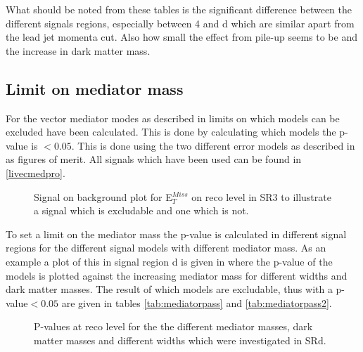 What should be noted from these tables is the significant difference between the different signals regions, especially between 4 and d which are similar apart from the lead jet momenta cut. Also how small the effect from pile-up seems to be and the increase in dark matter mass.

\newpage
\subsection{Limit on mediator mass}\label{sec:res:subsec:Mm}
For the vector mediator modes as described in  limits on which models can be excluded have been calculated. This is done by calculating which models the p-value is $<0.05$. This is done using the two different error models as described in  as figures of merit. All signals which have been used can be found in \ref{livecmedpro}.


 \begin{figure}[H] %
    \hfill
    \caption{Signal on background plot for E$^{Miss}_T$ on reco level in SR3 to illustrate a signal which is excludable and one which is not. }
    \label{fig:sigback}
  \end{figure}

To set a limit on the mediator mass the p-value is calculated in different signal regions for the different signal models with different mediator mass. As an example a plot of this in signal region d is given in  where the p-value of the models is plotted against the increasing mediator mass for different widths and dark matter masses. The result of which models are excludable, thus with a p-value$<0.05$ are given in tables \ref{tab:mediatorpass} and \ref{tab:mediatorpass2}.

 \begin{figure}[H] %
    \hfill
    \caption{P-values at reco level for the the different mediator masses, dark matter masses and different widths which were investigated in SRd.}
    \label{fig:modelex}
  \end{figure}



